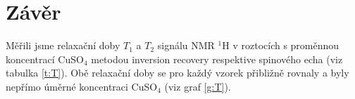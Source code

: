 \section*{Závěr}
Měřili jsme relaxační doby $T_1$ a $T_2$ signálu NMR $^1$H v roztocích s proměnnou koncentrací CuSO$_4$ metodou inversion recovery respektive spinového echa (viz tabulka \ref{t:T}).
Obě relaxační doby se pro každý vzorek přibližně rovnaly a byly nepřímo úměrné koncentraci CuSO$_4$ (viz graf \ref{g:T}).